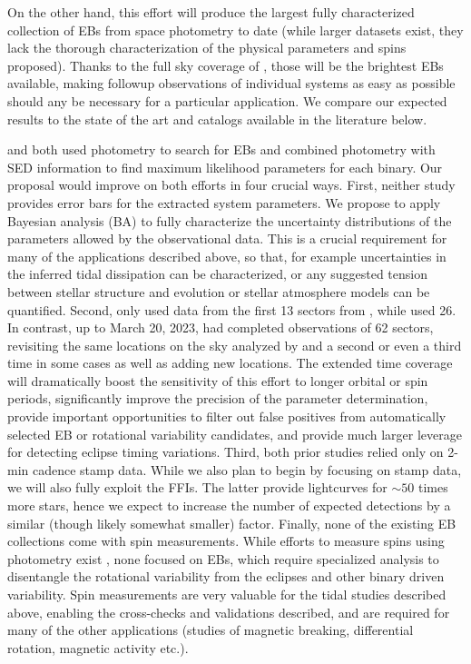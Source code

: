 On the other hand, this effort will produce the largest fully characterized
collection of EBs from space photometry to date (while larger datasets exist,
they lack the thorough characterization of the physical parameters and spins
proposed). Thanks to the full sky coverage of \tess{}, those will be the
brightest EBs available, making followup observations of individual systems as
easy as possible should any be necessary for a particular application. We
compare our expected results to the state of the art \tess{} and \kepler{}
catalogs available in the literature below.

\citep{Prsa_et_al_22} and \citep{Justesen_Albrecht_21} both used \tess{}
photometry to search for EBs and \citep{Justesen_Albrecht_21} combined
photometry with SED information to find maximum likelihood parameters for each
binary. Our proposal would improve on both efforts in four crucial ways.  First,
neither study provides error bars for the extracted system parameters. We
propose to apply Bayesian analysis (BA) to fully characterize the uncertainty
distributions of the parameters allowed by the observational data.  This is a
crucial requirement for many of the applications described above, so that, for
example uncertainties in the inferred tidal dissipation can be characterized, or
any suggested tension between stellar structure and evolution or stellar
atmosphere models can be quantified. Second, \citep{Justesen_Albrecht_21} only
used data from the first 13 sectors from \tess{}, while \citep{Prsa_et_al_22}
used 26. In contrast, up to March 20, 2023, \tess{} had completed observations
of 62 sectors, revisiting the same locations on the sky analyzed by
\citep{Prsa_et_al_22} and \citep{Justesen_Albrecht_21} a second or even a third
time in some cases as well as adding new locations. The extended time coverage
will dramatically boost the sensitivity of this effort to longer orbital or spin
periods, significantly improve the precision of the parameter determination,
provide important opportunities to filter out false positives from automatically
selected EB or rotational variability candidates, and provide much larger
leverage for detecting eclipse timing variations.  Third, both prior studies
relied only on \tess{} 2-min cadence stamp data. While we also plan to begin by
focusing on stamp data, we will also fully exploit the FFIs. The latter provide
lightcurves for $\sim50$ times more stars, hence we expect to increase the
number of expected detections by a similar (though likely somewhat smaller)
factor. Finally, none of the existing \tess{} EB collections come with spin
measurements. While efforts to measure spins using \tess{} photometry exist
\citep[e.g.][]{CantoMartins_et_al_20, Holcomb_et_al_22}, none focused on EBs,
which require specialized analysis to disentangle the rotational variability
from the eclipses and other binary driven variability. Spin measurements are
very valuable for the tidal studies described above, enabling the cross-checks
and validations described, and are required for many of the other applications
(studies of magnetic breaking, differential rotation, magnetic activity etc.).

